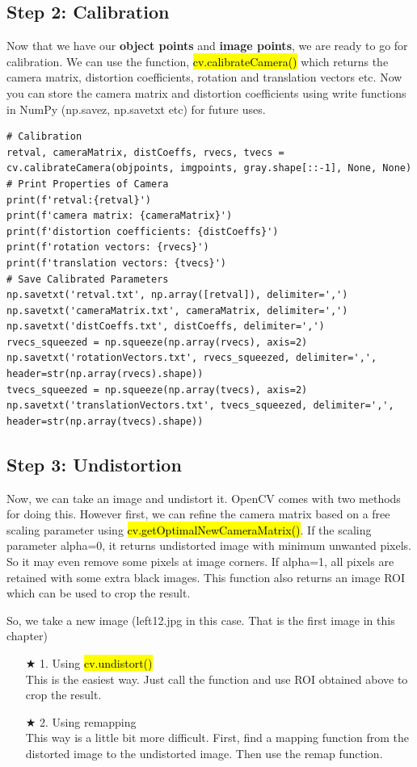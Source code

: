 \documentclass{article}
\begin{document}
\subsection{Step 2: Calibration}
\label{ssec: 2_calibrate}
Now that we have our \textbf{object points} and \textbf{image points}, we are ready to go for calibration. We can use the function, \hl{cv.calibrateCamera()} which returns the camera matrix, distortion coefficients, rotation and translation vectors etc. Now you can store the camera matrix and distortion coefficients using write functions in NumPy (np.savez, np.savetxt etc) for future uses.

\lstset{language=Python}
\lstset{frame=lines}
\lstset{basicstyle=\footnotesize}
\begin{lstlisting}
# Calibration
retval, cameraMatrix, distCoeffs, rvecs, tvecs = cv.calibrateCamera(objpoints, imgpoints, gray.shape[::-1], None, None)
# Print Properties of Camera
print(f'retval:{retval}')
print(f'camera matrix: {cameraMatrix}')
print(f'distortion coefficients: {distCoeffs}')
print(f'rotation vectors: {rvecs}')
print(f'translation vectors: {tvecs}')
# Save Calibrated Parameters
np.savetxt('retval.txt', np.array([retval]), delimiter=',')
np.savetxt('cameraMatrix.txt', cameraMatrix, delimiter=',')
np.savetxt('distCoeffs.txt', distCoeffs, delimiter=',')
rvecs_squeezed = np.squeeze(np.array(rvecs), axis=2)
np.savetxt('rotationVectors.txt', rvecs_squeezed, delimiter=',', header=str(np.array(rvecs).shape))
tvecs_squeezed = np.squeeze(np.array(tvecs), axis=2)
np.savetxt('translationVectors.txt', tvecs_squeezed, delimiter=',', header=str(np.array(tvecs).shape))
\end{lstlisting}


\subsection{Step 3: Undistortion}
\label{ssec: 3_undistortion}
Now, we can take an image and undistort it. OpenCV comes with two methods for doing this. However first, we can refine the camera matrix based on a free scaling parameter using \hl{cv.getOptimalNewCameraMatrix()}. If the scaling parameter alpha=0, it returns undistorted image with minimum unwanted pixels. So it may even remove some pixels at image corners. If alpha=1, all pixels are retained with some extra black images. This function also returns an image ROI which can be used to crop the result.

So, we take a new image (left12.jpg in this case. That is the first image in this chapter) \begin{itemize}
	\item [$\bigstar$ 1.] Using \hl{cv.undistort()} \\
This is the easiest way. Just call the function and use ROI obtained above to crop the result.
	\item [$\bigstar$ 2.]Using remapping \\
This way is a little bit more difficult. First, find a mapping function from the distorted image to the undistorted image. Then use the remap function.
\end{itemize}
\end{document}
